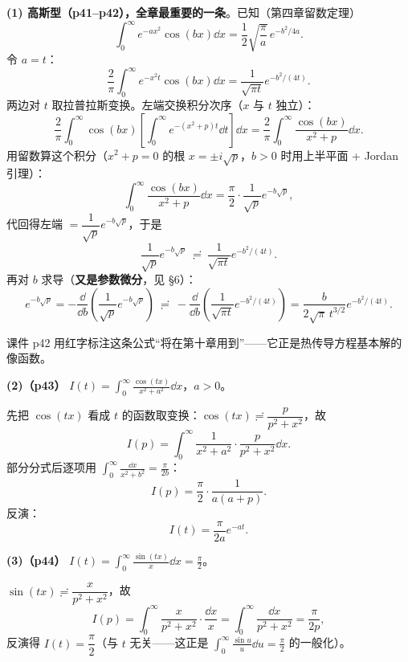 \documentclass[11pt]{ctexart}
\begin{document}

\textbf{(1) 高斯型（p41--p42），全章最重要的一条}。已知（第四章留数定理）
\[ \int_0^{\infty}e^{-ax^{2}}\cos(bx)\dd x=\frac{1}{2}\sqrt{\frac{\pi}{a}}\,e^{-b^{2}/4a} .\]
令 $a=t$：
\[ \frac{2}{\pi}\int_0^{\infty}e^{-x^{2}t}\cos(bx)\dd x=\frac{1}{\sqrt{\pi t}}e^{-b^{2}/(4t)} .\]
两边对 $t$ 取拉普拉斯变换。左端交换积分次序（$x$ 与 $t$ 独立）：
\[
\frac{2}{\pi}\int_0^{\infty}\cos(bx)\left[\int_0^{\infty}e^{-(x^{2}+p)t}\dd t\right]\dd x
=\frac{2}{\pi}\int_0^{\infty}\frac{\cos(bx)}{x^{2}+p}\dd x .
\]
用留数算这个积分（$x^{2}+p=0$ 的根 $x=\pm i\sqrt{p}$，$b>0$ 时用上半平面 + Jordan 引理）：
\[
\int_0^{\infty}\frac{\cos(bx)}{x^{2}+p}\dd x
=\frac{\pi}{2}\cdot\frac{1}{\sqrt{p}}e^{-b\sqrt{p}} ,
\]
代回得左端 $=\dfrac{1}{\sqrt{p}}e^{-b\sqrt{p}}$，于是
\[ \frac{1}{\sqrt{p}}e^{-b\sqrt{p}}\ \risingdotseq\ \frac{1}{\sqrt{\pi t}}e^{-b^{2}/(4t)} .\]
再对 $b$ 求导（\textbf{又是参数微分}，见 §6）：
\[
e^{-b\sqrt{p}}=-\frac{\dd}{\dd b}\left(\frac{1}{\sqrt{p}}e^{-b\sqrt{p}}\right)
\ \risingdotseq\ -\frac{\dd}{\dd b}\left(\frac{1}{\sqrt{\pi t}}e^{-b^{2}/(4t)}\right)
=\frac{b}{2\sqrt{\pi}\,t^{3/2}}e^{-b^{2}/(4t)} .
\]


课件 p42 用红字标注这条公式“将在第十章用到”——它正是热传导方程基本解的像函数。

\textbf{(2)（p43）} $I(t)=\displaystyle\int_0^{\infty}\frac{\cos(tx)}{x^{2}+a^{2}}\dd x$，$a>0$。

先把 $\cos(tx)$ 看成 $t$ 的函数取变换：$\cos(tx)\risingdotseq\dfrac{p}{p^{2}+x^{2}}$，故
\[
I(p)=\int_0^{\infty}\frac{1}{x^{2}+a^{2}}\cdot\frac{p}{p^{2}+x^{2}}\dd x .
\]
部分分式后逐项用 $\displaystyle\int_0^\infty\frac{\dd x}{x^{2}+b^{2}}=\frac{\pi}{2b}$：
\[
I(p)=\frac{\pi}{2}\cdot\frac{1}{a(a+p)} .
\]
反演：
\[ I(t)=\frac{\pi}{2a}e^{-at} .\]

\textbf{(3)（p44）} $I(t)=\displaystyle\int_0^{\infty}\frac{\sin(tx)}{x}\dd x=\frac{\pi}{2}$。

$\sin(tx)\risingdotseq\dfrac{x}{p^{2}+x^{2}}$，故
\[ I(p)=\int_0^{\infty}\frac{x}{p^{2}+x^{2}}\cdot\frac{\dd x}{x}=\int_0^{\infty}\frac{\dd x}{p^{2}+x^{2}}=\frac{\pi}{2p} ,\]
反演得 $I(t)=\dfrac{\pi}{2}$（与 $t$ 无关——这正是 $\int_0^\infty\frac{\sin u}{u}\dd u=\frac{\pi}{2}$ 的一般化）。
\end{document}
